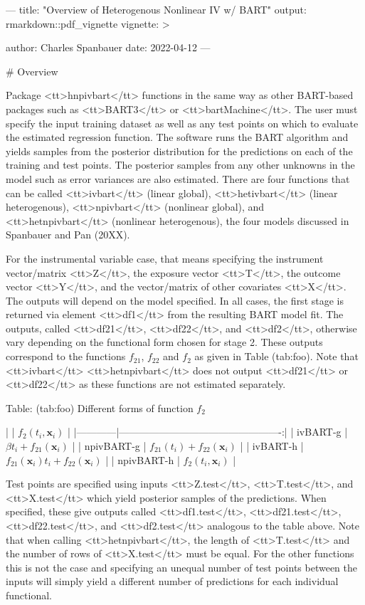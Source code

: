 ---
title: "Overview of Heterogenous Nonlinear IV w/ BART"
output: rmarkdown::pdf_vignette
vignette: >

author: Charles Spanbauer
date: 2022-04-12
---

# Overview

Package <tt>hnpivbart</tt> functions in the same way as other BART-based packages such as <tt>BART3</tt> or <tt>bartMachine</tt>. The user must specify the input training dataset as well as any test points on which to evaluate the estimated regression function. The software runs the BART algorithm and yields samples from the posterior distribution for the predictions on each of the training and test points. The posterior samples from any other unknowns in the model such as error variances are also estimated. There are four functions that can be called <tt>ivbart</tt> (linear global), <tt>hetivbart</tt> (linear heterogenous), <tt>npivbart</tt> (nonlinear global), and <tt>hetnpivbart</tt> (nonlinear heterogenous), the four models discussed in Spanbauer and Pan (20XX).    

For the instrumental variable case, that means specifying the instrument vector/matrix <tt>Z</tt>, the exposure vector <tt>T</tt>, the outcome vector <tt>Y</tt>, and the vector/matrix of other covariates <tt>X</tt>. The outputs will depend on the model specified. In all cases, the first stage is returned via element <tt>df1</tt> from the resulting BART model fit. The outputs, called <tt>df21</tt>, <tt>df22</tt>, and <tt>df2</tt>, otherwise vary depending on the functional form chosen for stage 2. These outputs correspond to the functions $f_{21}$, $f_{22}$ and $f_2$ as given in Table \@ref(tab:foo). Note that <tt>ivbart</tt> <tt>hetnpivbart</tt> does not output <tt>df21</tt> or <tt>df22</tt> as these functions are not estimated separately.

Table: \@ref(tab:foo) Different forms of function $f_2$

|            |                          $f_2(t_i,\mathbf{x}_i)$ |
|------------|-------------------------------------------------:|
| ivBART-g   |               $\beta t_i + f_{21}(\mathbf{x}_i)$ |
| npivBART-g |             $f_{21}(t_i) + f_{22}(\mathbf{x}_i)$ |
| ivBART-h   | $f_{21}(\mathbf{x}_i)t_i + f_{22}(\mathbf{x}_i)$ |
| npivBART-h |                          $f_2(t_i,\mathbf{x}_i)$ |

Test points are specified using inputs <tt>Z.test</tt>, <tt>T.test</tt>, and <tt>X.test</tt> which yield posterior samples of the predictions. When specified, these give outputs called <tt>df1.test</tt>, <tt>df21.test</tt>, <tt>df22.test</tt>, and <tt>df2.test</tt> analogous to the table above. Note that when calling <tt>hetnpivbart</tt>, the length of <tt>T.test</tt> and the number of rows of <tt>X.test</tt> must be equal. For the other functions this is not the case and specifying an unequal number of test points between the inputs will simply yield a different number of predictions for each individual functional.

